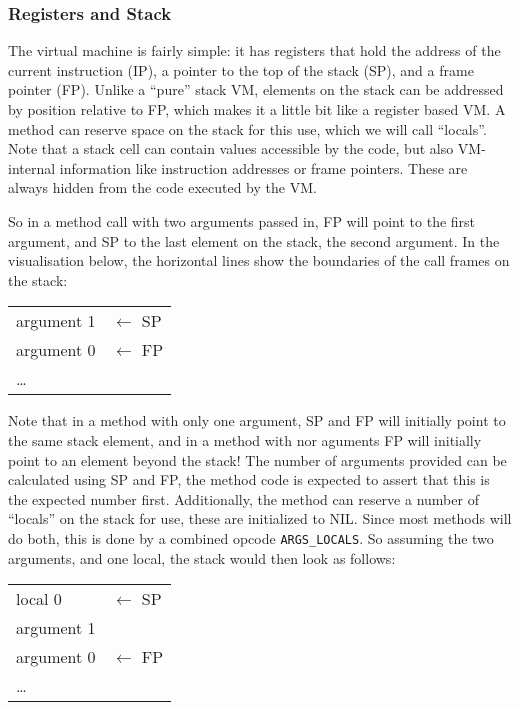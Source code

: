 \documentclass[12pt,a4paper]{article}
\begin{document}
\subsubsection{Registers and Stack}\label{sec:stack}

The virtual machine is fairly simple: it has registers that hold the address of the current instruction (IP), a pointer to the top of the stack (SP), and a frame pointer (FP). Unlike a ``pure'' stack VM, elements on the stack can be addressed by position relative to FP, which makes it a little bit like a register based VM. A method can reserve space on the stack for this use, which we will call ``locals''. Note that a stack cell can contain values accessible by the code, but also VM-internal information like instruction addresses or frame pointers. These are always hidden from the code executed by the VM.

So in a method call with two arguments passed in, FP will point to the first argument, and SP to the last element on the stack, the second argument. In the visualisation below, the horizontal lines show the boundaries of the call frames on the stack:

\begin{table}[h]
\centering
\begin{tabular}{|p{3cm}|p{3cm}}
argument 1 & $\leftarrow$ SP \\
argument 0 & $\leftarrow$ FP \\
\cline{1-1}
\ldots & \\
\end{tabular}
\end{table}

Note that in a method with only one argument, SP and FP will initially point to the same stack element, and in a method with nor aguments FP will initially point to an element beyond the stack! The number of arguments provided can be calculated using SP and FP, the method code is expected to assert that this is the expected number first. Additionally, the method can reserve a number of ``locals'' on the stack for use, these are initialized to NIL. Since most methods will do both, this is done by a combined opcode \verb|ARGS_LOCALS|. So assuming the two arguments, and one local, the stack would then look as follows:

\begin{table}[h]
\centering
\begin{tabular}{|p{3cm}|p{3cm}}
local 0 & $\leftarrow$ SP \\
argument 1 \\ 
argument 0 & $\leftarrow$ FP \\
\cline{1-1}
\ldots & \\
\end{tabular}
\end{table}
\end{document}
